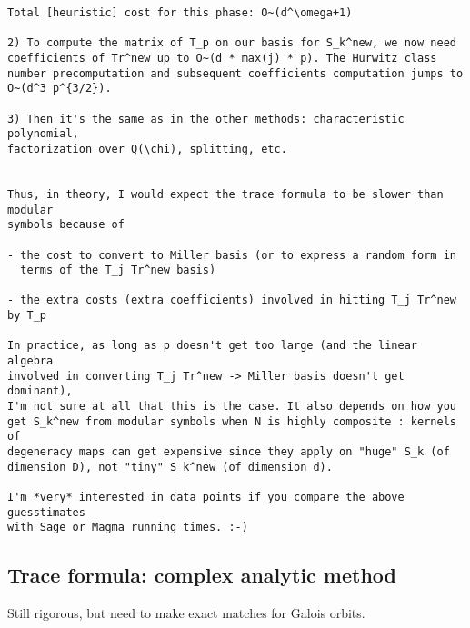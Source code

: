 \documentclass[11pt]{amsart}
\numberwithin{equation}{subsection}
\theoremstyle{plain}
\theoremstyle{definition}
\begin{document}
\begin{verbatim}
Total [heuristic] cost for this phase: O~(d^\omega+1)

2) To compute the matrix of T_p on our basis for S_k^new, we now need
coefficients of Tr^new up to O~(d * max(j) * p). The Hurwitz class
number precomputation and subsequent coefficients computation jumps to
O~(d^3 p^{3/2}).

3) Then it's the same as in the other methods: characteristic polynomial,
factorization over Q(\chi), splitting, etc.


Thus, in theory, I would expect the trace formula to be slower than modular
symbols because of

- the cost to convert to Miller basis (or to express a random form in
  terms of the T_j Tr^new basis)

- the extra costs (extra coefficients) involved in hitting T_j Tr^new by T_p

In practice, as long as p doesn't get too large (and the linear algebra
involved in converting T_j Tr^new -> Miller basis doesn't get dominant),
I'm not sure at all that this is the case. It also depends on how you
get S_k^new from modular symbols when N is highly composite : kernels of
degeneracy maps can get expensive since they apply on "huge" S_k (of
dimension D), not "tiny" S_k^new (of dimension d).

I'm *very* interested in data points if you compare the above guesstimates
with Sage or Magma running times. :-)
\end{verbatim}

\subsection{Trace formula: complex analytic method}

Still rigorous, but need to make exact matches for Galois orbits.
\end{document}
